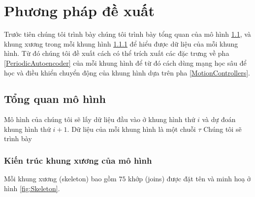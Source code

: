 %   

\chapter{Phương pháp đề xuất}
\label{Chapter3}


Trước tiên chúng tôi trình bày chúng tôi trình bày tổng quan của mô hình \ref{Overview},  và khung xương trong mỗi khung hình \ref{Skeleton} để hiểu được dữ liệu của mỗi khung hình. Từ đó chúng tôi đề xuất cách có thể trích xuất các đặc trưng về pha \ref{PeriodicAutoencoder} của mỗi khung hình để từ đó cách dùng mạng học sâu để học và điều khiển chuyển động của khung hình dựa trên pha \ref{MotionControllers}.

\section{Tổng quan mô hình}
\label{Overview}

Mô hình của chúng tôi sẽ lấy dữ liệu đầu vào ở khung hình thứ $i$ và dự đoán khung hình thứ $i+1$. Dữ liệu của mỗi khung hình là một chuỗi $\tau$ Chúng tôi sẽ trình bày 
% 

\subsection{Kiến trúc khung xương của mô hình}
\label{Skeleton}

Mỗi khung xương (skeleton) bao gồm $75$ khớp (joins) được đặt tên và minh hoạ ở hình \ref{fig:Skeleton}. 


